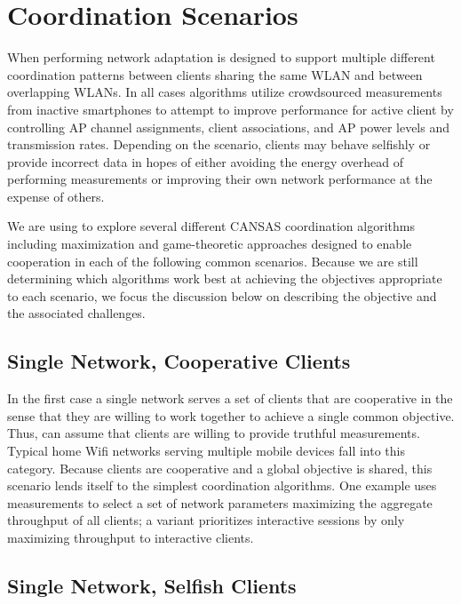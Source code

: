 \section{Coordination Scenarios}
\label{sec-algorithms}

When performing network adaptation \PS{} is designed to support multiple
different coordination patterns between clients sharing the same WLAN and
between overlapping WLANs. In all cases \PS{} algorithms utilize crowdsourced
measurements from inactive smartphones to attempt to improve performance for
active client by controlling AP channel assignments, client associations, and
AP power levels and transmission rates. Depending on the scenario, clients
may behave selfishly or provide incorrect data in hopes of either avoiding
the energy overhead of performing measurements or improving their own network
performance at the expense of others.

We are using \PS{} to explore several different CANSAS coordination
algorithms including maximization and game-theoretic approaches designed to
enable cooperation in each of the following common scenarios. Because we are
still determining which algorithms work best at achieving the objectives
appropriate to each scenario, we focus the discussion below on describing the
objective and the associated challenges.

\subsection{Single Network, Cooperative Clients}

In the first case a single network serves a set of clients that are
cooperative in the sense that they are willing to work together to achieve a
single common objective. Thus, \PS{} can assume that clients are willing to
provide truthful measurements. Typical home Wifi networks serving multiple
mobile devices fall into this category. Because clients are cooperative and a
global objective is shared, this scenario lends itself to the simplest
coordination algorithms. One example uses \PS{} measurements to select a set
of network parameters maximizing the aggregate throughput of all clients; a
variant prioritizes interactive sessions by only maximizing throughput to
interactive clients.

\subsection{Single Network, Selfish Clients}

